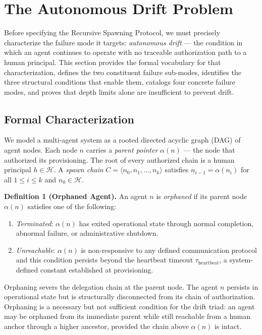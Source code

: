 \section{The Autonomous Drift Problem}
\label{sec:rs-drift}

Before specifying the Recursive Spawning Protocol, we must precisely characterize the failure mode it targets: \emph{autonomous drift} — the condition in which an agent continues to operate with no traceable authorization path to a human principal. This section provides the formal vocabulary for that characterization, defines the two constituent failure sub-modes, identifies the three structural conditions that enable them, catalogs four concrete failure modes, and proves that depth limits alone are insufficient to prevent drift.

\subsection{Formal Characterization}
\label{sec:rs-drift-formal}

We model a multi-agent system as a rooted directed acyclic graph (DAG) of agent nodes. Each node $n$ carries a \emph{parent pointer} $\alpha(n)$ — the node that authorized its provisioning. The root of every authorized chain is a human principal $h \in \mathcal{H}$. A \emph{spawn chain} $C = \langle n_0, n_1, \ldots, n_k \rangle$ satisfies $n_{i-1} = \alpha(n_i)$ for all $1 \leq i \leq k$ and $n_0 \in \mathcal{H}$.

\medskip
\noindent\textbf{Definition 1 (Orphaned Agent).}
An agent $n$ is \emph{orphaned} if its parent node $\alpha(n)$ satisfies one of the following:

\begin{enumerate}
  \item[(a)] \emph{Terminated}: $\alpha(n)$ has exited operational state through normal completion, abnormal failure, or administrative shutdown.
  \item[(b)] \emph{Unreachable}: $\alpha(n)$ is non-responsive to any defined communication protocol and this condition persists beyond the heartbeat timeout $\tau_{\mathrm{heartbeat}}$, a system-defined constant established at provisioning.
\end{enumerate}

Orphaning severs the delegation chain at the parent node. The agent $n$ persists in operational state but is structurally disconnected from its chain of authorization. Orphaning is a necessary but not sufficient condition for the drift triad: an agent may be orphaned from its immediate parent while still reachable from a human anchor through a higher ancestor, provided the chain above $\alpha(n)$ is intact.

